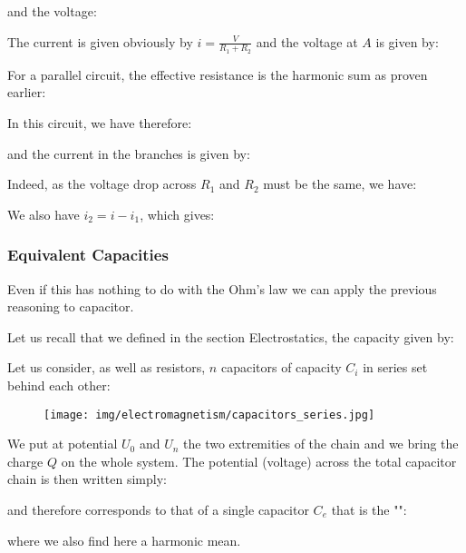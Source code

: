     and the voltage:
    
     The current is given obviously by $i = \tfrac{V}{R_1+R_2}$ and the voltage at $A$ is given by:
     
    
    For a parallel circuit, the effective resistance is the harmonic sum as proven earlier:
    \begin{center}
    \end{center}
    In this circuit, we have therefore:
    
    and the current in the branches is given by:
    
    Indeed, as the voltage drop across $R_1$ and $R_2$ must be the same, we  have:
    
    We also have $i_2=i-i_1$, which gives:
    
	
	\subsubsection{Equivalent Capacities}
	Even if this has nothing to do with the Ohm's law we can apply the previous reasoning to capacitor.
	
	Let us recall that we defined in the section Electrostatics, the capacity given by:
	
	Let us consider, as well as resistors, $n$ capacitors of capacity  $C_i$ in series set behind each other:
	\begin{figure}[H]
		\centering
		\texttt{[image: img/electromagnetism/capacitors\_series.jpg]}
	\end{figure}	
	 We put at potential $U_0$ and $U_n$ the two extremities of the chain and we bring the charge $Q$ on the whole system. The potential (voltage) across the total capacitor chain is then written simply:
	
	and therefore corresponds to that of a single capacitor $C_e$ that is the "":
	
	where we also find here a harmonic mean.
	
